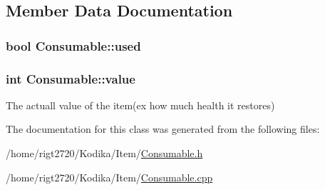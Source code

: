 \subsection{Member Data Documentation}
\hypertarget{classConsumable_a261f0f34c301027337ffe6bf32bf0200}{
\subsubsection[{used}]{\setlength{\rightskip}{0pt plus 5cm}bool Consumable\-::used\hspace{0.3cm}{\ttfamily [protected]}}}\label{classConsumable_a261f0f34c301027337ffe6bf32bf0200}
\hypertarget{classConsumable_a492024e0b8fd5b6c6e944116cbff3e32}{
\subsubsection[{value}]{\setlength{\rightskip}{0pt plus 5cm}int Consumable\-::value\hspace{0.3cm}{\ttfamily [protected]}}}\label{classConsumable_a492024e0b8fd5b6c6e944116cbff3e32}


The actuall value of the item(ex how much health it restores) 



The documentation for this class was generated from the following files\-:\begin{DoxyCompactItemize}
\item 
/home/rigt2720/\-Kodika/\-Item/\hyperlink{Consumable_8h}{Consumable.\-h}\item 
/home/rigt2720/\-Kodika/\-Item/\hyperlink{Consumable_8cpp}{Consumable.\-cpp}\end{DoxyCompactItemize}
